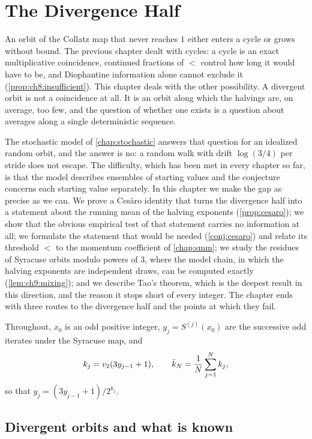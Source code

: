 \chapter{The Divergence Half}\label{chap:divergence}

An orbit of the Collatz map that never reaches $1$ either enters a cycle or
grows without bound.
The previous chapter dealt with cycles: a cycle is an exact multiplicative coincidence, continued fractions of $\lt$ control how long it would have to be, and Diophantine information alone cannot exclude it (\cref{prop:ch8:insufficient}).
This chapter deals with the other possibility. A divergent orbit is not a
coincidence at all. It is an orbit along which the halvings are, on average,
too few, and the question of whether one exists is a question about averages
along a single deterministic sequence.

The stochastic model of \cref{chap:stochastic} answers that question for an
idealized random orbit, and the answer is no: a random walk with drift
$\log(3/4)$ per stride does not escape. The difficulty, which has been met in
every chapter so far, is that the model describes ensembles of starting values
and the conjecture concerns each starting value separately. In this chapter
we make the gap as precise as we can. We prove a Ces\`aro identity that turns the
divergence half into a statement about the running mean of the halving
exponents (\cref{prop:cesaro}); we show that the obvious empirical test of
that statement carries no information at all; we formulate the statement that
would be needed (\cref{conj:cesaro}) and relate its threshold $\lt$ to the
momentum coefficient of \cref{chap:smm}; we study the residues of Syracuse
orbits modulo powers of $3$, where the model chain, in which the halving
exponents are independent draws, can be computed
exactly (\cref{lem:ch9:mixing}); and we describe Tao's theorem, which is the
deepest result in this direction, and the reason it stops short of every
integer. The chapter ends with three routes to the divergence half and the
points at which they fail.

Throughout, $x_0$ is an odd positive integer, $y_j=S^{(j)}(x_0)$ are the
successive odd iterates under the Syracuse map, and
\[
  k_j=v_2(3y_{j-1}+1),\qquad\bar k_N=\frac1N\sum_{j=1}^Nk_j ,
\]
so that $y_j=(3y_{j-1}+1)/2^{k_j}$.

\section{Divergent orbits and what is known}\label{sec:ch9:known}

